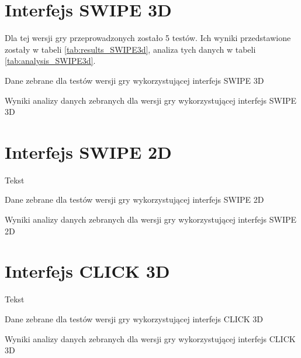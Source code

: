 \documentclass[a4paper,12pt,numbers=noenddot]{report}
\begin{document}
\section{Interfejs SWIPE 3D}%
Dla tej wersji gry przeprowadzonych zostało 5 testów. Ich wyniki przedstawione zostały w tabeli \ref{tab:results_SWIPE3d}, analiza tych danych w tabeli \ref{tab:analysis_SWIPE3d}.


\begin{table}
  \caption{Dane zebrane dla testów wersji gry wykorzystującej interfejs SWIPE 3D}
  \resizebox{\textwidth}{!}{%
	
  \end{tabular}%
  }
  \label{tab:results_SWIPE3d}%
  \caption{Wyniki analizy danych zebranych dla wersji gry wykorzystującej interfejs SWIPE 3D}
  \resizebox{\textwidth}{!}{%
	
  \end{tabular}%
  }
  \label{tab:analysis_SWIPE3d}%
\end{table}%


\section{Interfejs SWIPE 2D}%
Tekst
\begin{table}
  \caption{Dane zebrane dla testów wersji gry wykorzystującej interfejs SWIPE 2D}
  \resizebox{0.9\textwidth}{!}{%
	
  }
  \label{tab:results_SWIPE2d}%
  
  
  \caption{Wyniki analizy danych zebranych dla wersji gry wykorzystującej interfejs SWIPE 2D}
  \resizebox{0.9\textwidth}{!}{%
	
  }
  \label{tab:analysis_SWIPE2d}%
\end{table}%

\section{Interfejs CLICK 3D}%
Tekst

\begin{table}
  \caption{Dane zebrane dla testów wersji gry wykorzystującej interfejs CLICK 3D}
  \resizebox{0.9\textwidth}{!}{%
	
  }
  \label{tab:results_CLICK3d}%
  \caption{Wyniki analizy danych zebranych dla wersji gry wykorzystującej interfejs CLICK 3D}
  \resizebox{0.9\textwidth}{!}{%
	
  }
  \label{tab:analysis_CLICK3d}%
\end{table}%
\end{document}

